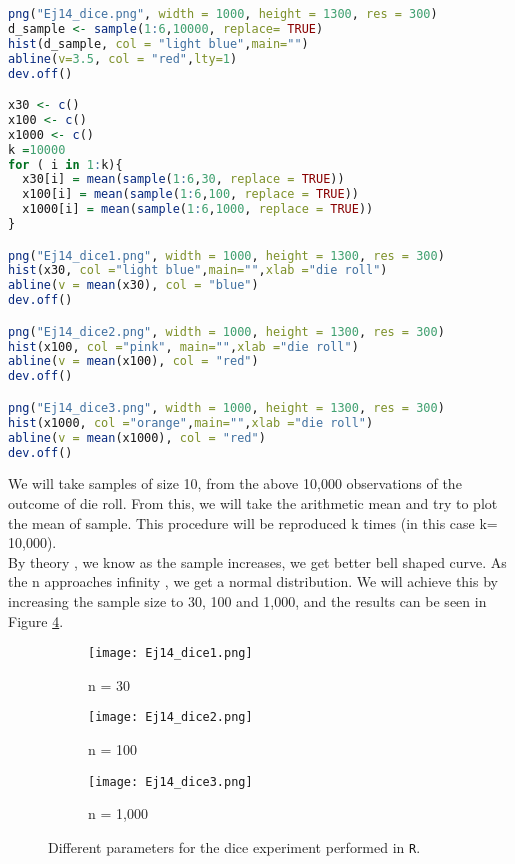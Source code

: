 \documentclass{article}
\begin{document}
\begin{lstlisting}[language=R, caption=R extract of the code used to perform the dice experiment, label = lol ]
png("Ej14_dice.png", width = 1000, height = 1300, res = 300)
d_sample <- sample(1:6,10000, replace= TRUE)
hist(d_sample, col = "light blue",main="")
abline(v=3.5, col = "red",lty=1)
dev.off()

x30 <- c()
x100 <- c()
x1000 <- c()
k =10000
for ( i in 1:k){
  x30[i] = mean(sample(1:6,30, replace = TRUE))
  x100[i] = mean(sample(1:6,100, replace = TRUE))
  x1000[i] = mean(sample(1:6,1000, replace = TRUE))
}

png("Ej14_dice1.png", width = 1000, height = 1300, res = 300)
hist(x30, col ="light blue",main="",xlab ="die roll")
abline(v = mean(x30), col = "blue")
dev.off()

png("Ej14_dice2.png", width = 1000, height = 1300, res = 300)
hist(x100, col ="pink", main="",xlab ="die roll")
abline(v = mean(x100), col = "red")
dev.off()

png("Ej14_dice3.png", width = 1000, height = 1300, res = 300)
hist(x1000, col ="orange",main="",xlab ="die roll")
abline(v = mean(x1000), col = "red")
dev.off()

\end{lstlisting}

We will take samples of size 10, from the above 10,000 observations of the outcome of die roll. From this, we will take the arithmetic mean and try to plot the mean of sample. This procedure will be reproduced  k times (in this case k= 10,000). \\

By theory , we know as the sample increases, we get better bell shaped curve. As the n approaches infinity , we get a normal distribution. We will achieve this by increasing the sample size to 30, 100 and 1,000, and the results can be seen in Figure \ref{fig2}.\\

\begin{figure}[]
\begin{subfigure}{.5\textwidth}
  \centering
  \texttt{[image: Ej14\_dice1.png]}  
  \caption{n = 30}
  \label{sb2-1}
\end{subfigure}\hspace{5mm}%
\begin{subfigure}{.5\textwidth}
  \centering
  \texttt{[image: Ej14\_dice2.png]}  
  \caption{n = 100}
  \label{sb2-2}
\end{subfigure}\hspace{5mm}%
\newline
\begin{subfigure}{1\textwidth}
  \centering
  \texttt{[image: Ej14\_dice3.png]}  
  \caption{n = 1,000}
  \label{sb2-3}
\end{subfigure}
	\caption{Different parameters for the dice experiment performed in \texttt{R}.}
\label{fig2}
\end{figure}
\clearpage
\end{document}
